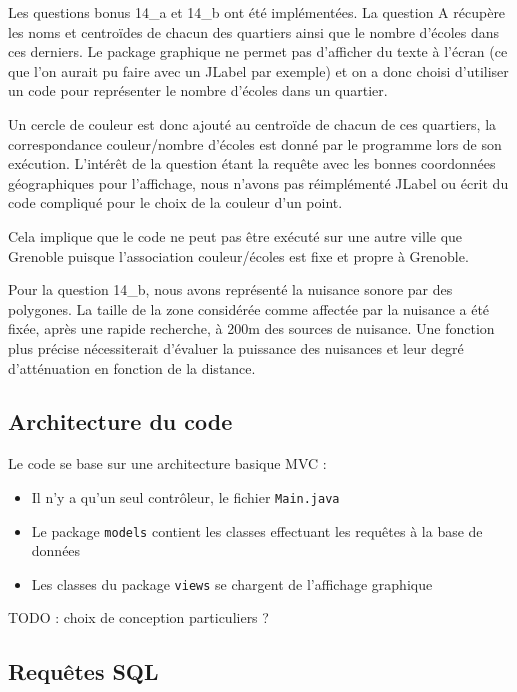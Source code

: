 \documentclass[12pt,a4paper]{article}
\begin{document}
Les questions bonus 14\_a et 14\_b ont été implémentées. La question A récupère les noms et centroïdes de chacun des quartiers ainsi que le nombre d'écoles dans ces derniers. Le package graphique ne permet pas d'afficher du texte à l'écran (ce que l'on aurait pu faire avec un JLabel par exemple) et on a donc choisi d'utiliser un code pour représenter le nombre d'écoles dans un quartier.

Un cercle de couleur est donc ajouté au centroïde de chacun de ces quartiers, la correspondance couleur/nombre d'écoles est donné par le programme lors de son exécution.
L'intérêt de la question étant la requête avec les bonnes coordonnées géographiques pour l'affichage, nous n'avons pas réimplémenté JLabel ou écrit du code compliqué pour le choix de la couleur d'un point.

Cela implique que le code ne peut pas être exécuté sur une autre ville que Grenoble puisque l'association couleur/écoles est fixe et propre à Grenoble.

Pour la question 14\_b, nous avons représenté la nuisance sonore par des polygones. La taille de la zone considérée comme affectée par la nuisance a été fixée, après une rapide recherche, à 200m des sources de nuisance. Une fonction plus précise nécessiterait d'évaluer la puissance des nuisances et leur degré d'atténuation en fonction de la distance.

\subsection*{Architecture du code}

Le code se base sur une architecture basique MVC :

\begin{itemize}
\item Il n'y a qu'un seul contrôleur, le fichier \verb?Main.java?
\item Le package \verb?models? contient les classes effectuant les requêtes à la base de données \item Les classes du package \verb?views? se chargent de l'affichage graphique
\end{itemize}

TODO : choix de conception particuliers ?

\subsection*{Requêtes SQL}
\end{document}
